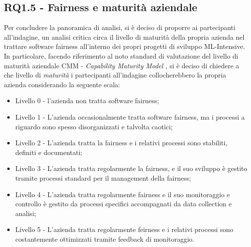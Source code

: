     \subsection{RQ1.5 - Fairness e maturità aziendale}
    \begin{center}
    	\hspace*{-5mm}%
    \end{center}
      
     Per concludere la panoramica di analisi, si è deciso di proporre ai partecipanti all'indagine, un analisi critica circa il livello di maturità della propria azienda nel trattare software fairness all'interno dei propri progetti di sviluppo ML-Intensive. In particolare, facendo riferimento al noto standard di valutazione del livello di maturità aziendale CMM - \emph{Capability Maturity Model} \cite{CMM}, si è deciso di chiedere a che livello di \emph{maturità} i partecipanti all'indagine collocherebbero la propria azienda considerando la seguente scala:
     
     \begin{itemize}
     	\item Livello 0 - l'azienda non tratta software fairness;
     	\item Livello 1 - L'azienda occasionalmente tratta software fairness, ma i processi a riguardo sono spesso disorganizzati e talvolta caotici;
     	\item Livello 2 - L'azienda tratta la fairness e i relativi processi sono stabiliti, definiti e documentati;
     	\item Livello 3 - L'azienda tratta regolarmente la fairness, e il suo sviluppo è gestito tramite processi standard per il management della fairness;
     	\item Livello 4 - L'azienda tratta regolarmente fairness e il suo monitoraggio e controllo è gestito da processi specifici accompagnati da data collection e analisi;
     	\item Livello 5 - L'azienda tratta regolarmente feirness e i relativi processi sono costantemente ottimizzati tramite feedback di monitoraggio.
     \end{itemize}
 

